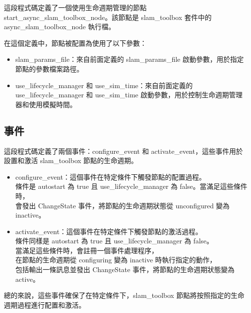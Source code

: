 這段程式碼定義了一個使用生命週期管理的節點 start\_async\_slam\_toolbox\_node。該節點是 slam\_toolbox 套件中的 async\_slam\_toolbox\_node 執行檔。

在這個定義中，節點被配置為使用了以下參數：
\begin{itemize}
    \item slam\_params\_file：來自前面定義的 slam\_params\_file 啟動參數，用於指定節點的參數檔案路徑。
    \item use\_lifecycle\_manager 和 use\_sim\_time：來自前面定義的 use\_lifecycle\_manager 和 use\_sim\_time 啟動參數，用於控制生命週期管理器和使用模擬時間。
\end{itemize}
\subsection{事件}
這段程式碼定義了兩個事件：configure\_event 和 activate\_event，這些事件用於設置和激活 slam\_toolbox 節點的生命週期。

\begin{itemize}
    \item configure\_event：這個事件在特定條件下觸發節點的配置過程。\\
        條件是 autostart 為 true 且 use\_lifecycle\_manager 為 false。當滿足這些條件時，\\
        會發出 ChangeState 事件，將節點的生命週期狀態從 unconfigured 變為 inactive。
    \item activate\_event：這個事件在特定條件下觸發節點的激活過程。\\
        條件同樣是 autostart 為 true 且 use\_lifecycle\_manager 為 false。\\
        當滿足這些條件時，會註冊一個事件處理程序，\\
        在節點的生命週期從 configuring 變為 inactive 時執行指定的動作，\\
        包括輸出一條訊息並發出 ChangeState 事件，將節點的生命週期狀態變為 active。
\end{itemize}
總的來說，這些事件確保了在特定條件下，slam\_toolbox 節點將按照指定的生命週期過程進行配置和激活。
